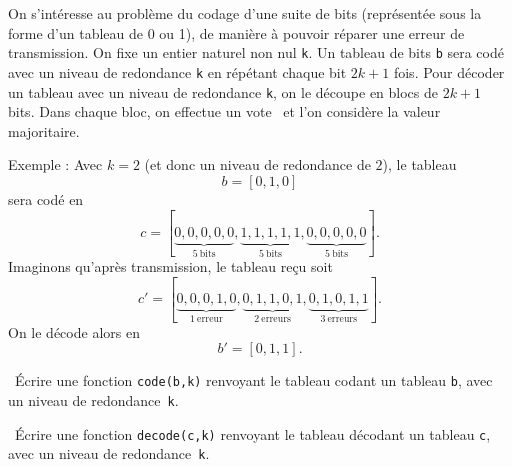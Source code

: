 \exer{}
\setcounter{numques}{0}

On s'intéresse au problème du codage d'une suite de bits (représentée sous la forme d'un tableau de 0 ou 1), de manière à pouvoir réparer une erreur de transmission. 
On fixe un entier naturel non nul \texttt{k}.
Un tableau de bits \texttt{b} sera codé avec un niveau de redondance \texttt{k} en répétant chaque bit $2k+1$ fois. 
Pour décoder un tableau avec un niveau de redondance \texttt{k}, on le découpe en blocs de $2k+1$ bits. Dans chaque bloc, on effectue un \og vote \fg\ et l'on considère la valeur majoritaire. 

Exemple : Avec $k = 2$ (et donc un niveau de redondance de $2$), le tableau 
\begin{equation*}
  b = [0,1,0]
\end{equation*}
sera codé en 
\begin{equation*}
  c = [\underbrace{0,0,0,0,0}_{5~\textrm{bits}},\underbrace{1,1,1,1,1}_{5~\textrm{bits}},\underbrace{0,0,0,0,0}_{5~\textrm{bits}}].
\end{equation*}
Imaginons qu'après transmission, le tableau reçu soit 
\begin{equation*}
  c' = [\underbrace{0,0,0,1,0}_{1~\textrm{erreur}},\underbrace{0,1,1,0,1}_{2~\textrm{erreurs}},\underbrace{0,1,0,1,1}_{3~\textrm{erreurs}}].
\end{equation*}
On le décode alors en 
\begin{equation*}
  b' = [0,1,1].
\end{equation*}

\question\ Écrire une fonction \texttt{code(b,k)} renvoyant le tableau codant un tableau \texttt{b}, avec un niveau de redondance~\texttt{k}. 

\question\ Écrire une fonction \texttt{decode(c,k)} renvoyant le tableau décodant un tableau \texttt{c}, avec un niveau de redondance~\texttt{k}. 



